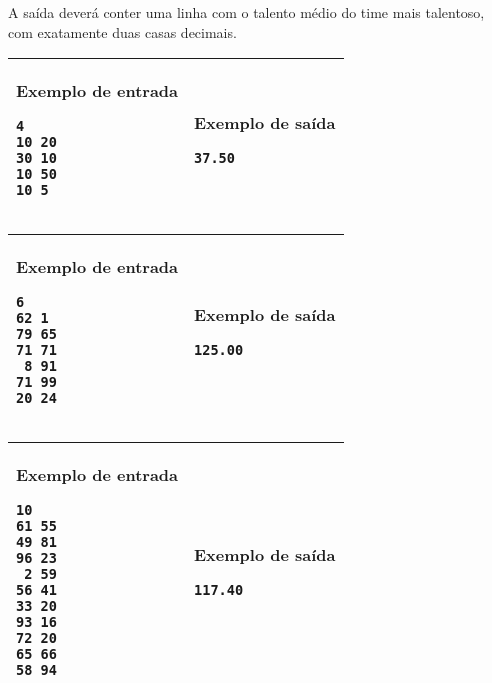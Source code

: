 A saída deverá conter uma linha com o talento médio do time mais talentoso, com
exatamente duas casas decimais.

\newpage
\begin{table}[!h]
\centering
\begin{tabular}{|l|l|}
\hline
\begin{minipage}[t]{3in}
\textbf{Exemplo de entrada}
\begin{verbatim}
4
10 20
30 10
10 50
10 5
\end{verbatim}
\vspace{1mm}
\end{minipage}
&
\begin{minipage}[t]{3in}
\textbf{Exemplo de saída}
\begin{verbatim}
37.50
\end{verbatim}
\vspace{1mm}
\end{minipage} \\
\hline
\end{tabular}
\end{table}

\begin{table}[!h]
\centering
\begin{tabular}{|l|l|}
\hline
\begin{minipage}[t]{3in}
\textbf{Exemplo de entrada}
\begin{verbatim}
6
62 1
79 65
71 71
 8 91
71 99
20 24
\end{verbatim}
\vspace{1mm}
\end{minipage}
&
\begin{minipage}[t]{3in}
\textbf{Exemplo de saída}
\begin{verbatim}
125.00
\end{verbatim}
\vspace{1mm}
\end{minipage} \\
\hline
\end{tabular}
\end{table}

\begin{table}[!h]
\centering
\begin{tabular}{|l|l|}
\hline
\begin{minipage}[t]{3in}
\textbf{Exemplo de entrada}
\begin{verbatim}
10
61 55
49 81
96 23
 2 59
56 41
33 20
93 16
72 20
65 66
58 94
\end{verbatim}
\vspace{1mm}
\end{minipage}
&
\begin{minipage}[t]{3in}
\textbf{Exemplo de saída}
\begin{verbatim}
117.40
\end{verbatim}
\vspace{1mm}
\end{minipage} \\
\hline
\end{tabular}
\end{table}
